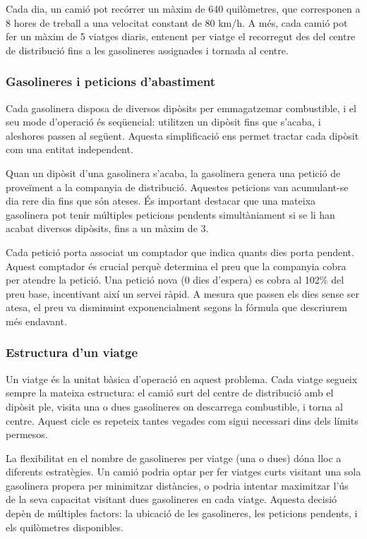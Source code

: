 Cada dia, un camió pot recórrer un màxim de 640 quilòmetres, que corresponen a 8 hores de treball a una velocitat constant de 80 km/h. A més, cada camió pot fer un màxim de 5 viatges diaris, entenent per viatge el recorregut des del centre de distribució fins a les gasolineres assignades i tornada al centre.

\subsubsection{Gasolineres i peticions d'abastiment}

 Cada gasolinera disposa de diversos dipòsits per emmagatzemar combustible, i el seu mode d'operació és seqüencial: utilitzen un dipòsit fins que s'acaba, i aleshores passen al següent. Aquesta simplificació ens permet tractar cada dipòsit com una entitat independent.

Quan un dipòsit d'una gasolinera s'acaba, la gasolinera genera una petició de proveïment a la companyia de distribució. Aquestes peticions van acumulant-se dia rere dia fins que són ateses. És important destacar que una mateixa gasolinera pot tenir múltiples peticions pendents simultàniament si se li han acabat diversos dipòsits, fins a un màxim de 3.

Cada petició porta associat un comptador que indica quants dies porta pendent. Aquest comptador és crucial perquè determina el preu que la companyia cobra per atendre la petició. Una petició nova (0 dies d'espera) es cobra al 102\% del preu base, incentivant així un servei ràpid. A mesura que passen els dies sense ser atesa, el preu va disminuint exponencialment segons la fórmula que descriurem més endavant.

\subsubsection{Estructura d'un viatge}

Un viatge és la unitat bàsica d'operació en aquest problema. Cada viatge segueix sempre la mateixa estructura: el camió surt del centre de distribució amb el dipòsit ple, visita una o dues gasolineres on descarrega combustible, i torna al centre. Aquest cicle es repeteix tantes vegades com sigui necessari dins dels límits permesos.

La flexibilitat en el nombre de gasolineres per viatge (una o dues) dóna lloc a diferents estratègies. Un camió podria optar per fer viatges curts visitant una sola gasolinera propera per minimitzar distàncies, o podria intentar maximitzar l'ús de la seva capacitat visitant dues gasolineres en cada viatge. Aquesta decisió depèn de múltiples factors: la ubicació de les gasolineres, les peticions pendents, i els quilòmetres disponibles.

